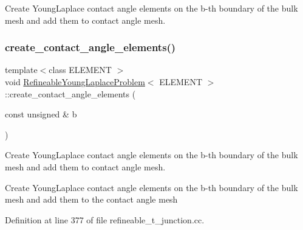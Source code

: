 Create Young\+Laplace contact angle elements on the b-\/th boundary of the bulk mesh and add them to contact angle mesh. 

\mbox{\label{classRefineableYoungLaplaceProblem_a00d1304e030120e76d9f316dd4053116}} 
\subsubsection{\texorpdfstring{create\+\_\+contact\+\_\+angle\+\_\+elements()}{create\_contact\_angle\_elements()}\hspace{0.1cm}{\footnotesize\ttfamily [2/2]}}
{\footnotesize\ttfamily template$<$class E\+L\+E\+M\+E\+NT $>$ \\
void \hyperlink{classRefineableYoungLaplaceProblem}{Refineable\+Young\+Laplace\+Problem}$<$ E\+L\+E\+M\+E\+NT $>$\+::create\+\_\+contact\+\_\+angle\+\_\+elements (\begin{DoxyParamCaption}\item[{const unsigned \&}]{b }\end{DoxyParamCaption})\hspace{0.3cm}{\ttfamily [private]}}



Create Young\+Laplace contact angle elements on the b-\/th boundary of the bulk mesh and add them to contact angle mesh. 

Create Young\+Laplace contact angle elements on the b-\/th boundary of the bulk mesh and add them to the contact angle mesh 

Definition at line 377 of file refineable\+\_\+t\+\_\+junction.\+cc.

\mbox{\label{classRefineableYoungLaplaceProblem_aaa270ba8da395897a5a99d052f076e0c}} 

